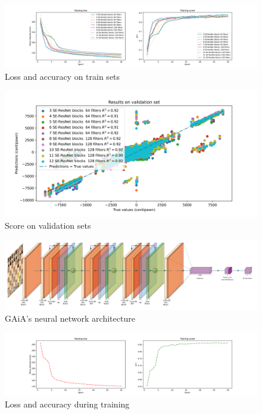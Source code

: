 \documentclass[a4paper]{article}
\begin{document}
\begin{figure}[H]
  \centering
  \includegraphics[width=15cm]{model_selection_1.pdf}
  \caption{Loss and accuracy on train sets}
  \label{fig:acc_loss}
\end{figure}

\begin{figure}[H]
  \centering
  \includegraphics[width=13cm]{model_selection_2.png}
  \caption{Score on validation sets}
  \label{fig:score_valid}
\end{figure}

\begin{figure}[H]
  \centering
  \includegraphics[width=13cm]{network/network.pdf}
  \caption{GAiA's neural network architecture}
  \label{fig:model_archi}
\end{figure}

\begin{figure}[H]
  \centering
  \includegraphics[width=15cm]{GAiA_history.pdf}
  \caption{Loss and accuracy during training}
  \label{fig:history}
\end{figure}
\end{document}
